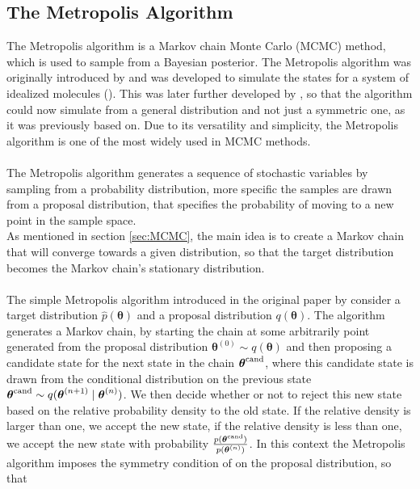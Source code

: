 \subsection{The Metropolis Algorithm} \label{sec:Metropolis}
The Metropolis algorithm is a Markov chain Monte Carlo (MCMC) method, which is used to sample from a Bayesian posterior. 
The Metropolis algorithm was originally introduced by \cite{Metropolis1953} and was developed to simulate the states for a system of idealized molecules (\cite{neal2012mcmc}). This was later further developed by \cite{hastings70}, so that the algorithm could now simulate from a general distribution and not just a symmetric one, as it was previously based on. Due to its versatility and simplicity, the Metropolis algorithm is one of the most widely used in MCMC methods.\\
\\
The Metropolis algorithm generates a sequence of stochastic variables by sampling from a probability distribution, more specific the samples are drawn from a proposal distribution, that specifies the probability of moving to a new point in the sample space. \\
As mentioned in section \ref{sec:MCMC}, the main idea is to create a Markov chain that will converge towards a given distribution, so that the target distribution becomes the Markov chain's stationary distribution.  \\
\\
The simple Metropolis algorithm introduced in the original paper by \cite{Metropolis1953} consider a target distribution $\hat{p}(\boldsymbol{\theta})$ and a proposal distribution $q(\boldsymbol{\theta})$. The algorithm generates a Markov chain, by starting the chain at some arbitrarily point generated from the proposal distribution $\boldsymbol{\theta}^{(0)}\sim q(\boldsymbol{\theta})$ and then proposing a candidate state for the next state in the chain $\boldsymbol{\theta}^{\text{\text{cand}}}$, where this candidate state is drawn from the conditional distribution on the previous state $\boldsymbol{\theta}^{\text{\text{cand}}}\sim q(\boldsymbol{\theta}^{(n+1)}\mid\boldsymbol{\theta}^{(n)})$. We then decide whether or not to reject this new state based on the relative probability density to the old state. If the relative density is larger than one, we accept the new state, if the relative density is less than one, we accept the new state with probability $\frac{p(\boldsymbol{\theta}^{\text{\text{cand}}})}{p(\boldsymbol{\theta}^{(n)})}$. In this context the Metropolis algorithm imposes the symmetry condition of on the proposal distribution, so that
